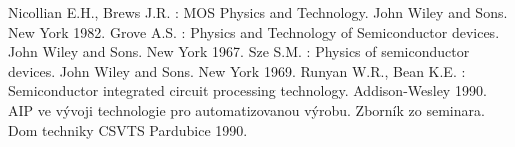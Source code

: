 \begin{thebibliography}{}
Nicollian E.H., Brews J.R. : MOS Physics  and  Technology. John Wiley and Sons. New York 1982.
Grove A.S. : Physics and Technology of Semiconductor devices. John Wiley and Sons. New York 1967.
Sze S.M. : Physics of semiconductor devices. John Wiley and Sons. New York 1969.
Runyan W.R., Bean K.E. : Semiconductor integrated  circuit  processing technology. Addison-Wesley 1990.
AIP ve vývoji technologie pro automatizovanou výrobu. Zborník zo seminara. Dom techniky CSVTS Pardubice 1990.
\end{thebibliography}
